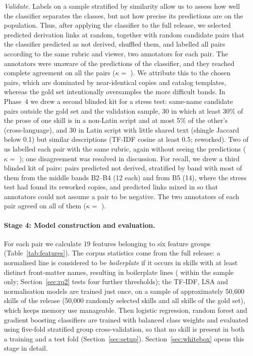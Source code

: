 \documentclass[sigconf,screen]{acmart}
\begin{document}
\emph{Validate.} Labels on a sample stratified by similarity allow us to assess how well the classifier separates the classes, but not how precise its predictions are on the population. Thus, after applying the classifier to the full release, we selected \ResValEdges{} predicted derivation links at random, together with \ResValDecoys{} random candidate pairs that the classifier predicted as not derived, shuffled them, and labelled all \ResValPairs{} pairs according to the same rubric and viewer, two annotators for each pair. The annotators were unaware of the predictions of the classifier, and they reached complete agreement on all the pairs ($\kappa = $ \ResValKappa{}). We attribute this to the chosen pairs, which are dominated by near-identical copies and catalog templates, whereas the gold set intentionally oversamples the more difficult bands. In Phase~4 we drew a second blinded kit for a stress test: \ResSTPairs{} same-name candidate pairs outside the gold set and the validation sample, 30 in which at least 30\% of the prose of one skill is in a non-Latin script and at most 5\% of the other's (cross-language), and 30 in Latin script with little shared text (shingle Jaccard below 0.1) but similar descriptions (TF-IDF cosine at least 0.5; reworked). Two of us labelled each pair with the same rubric, again without seeing the predictions ($\kappa = $ \ResSTKappa{}); one disagreement was resolved in discussion. For recall, we drew a third blinded kit of \ResRCPairs{} pairs: \ResRCNeg{} pairs predicted not derived, stratified by band with most of them from the middle bands B2--B4 (12 each) and from B5 (14), where the stress test had found its reworked copies, and \ResRCPos{} predicted links mixed in so that annotators could not assume a pair to be negative. The two annotators of each pair agreed on all of them ($\kappa = $ \ResRCKappa{}).

\paragraph{Stage 4: Model construction and evaluation.} For each pair we calculate 19 features belonging to six feature groups (Table~\ref{tab:features}). The corpus statistics come from the full release: a normalised line is considered to be \emph{boilerplate} if it occurs in skills with at least \ResBoilerK{} distinct front-matter names, resulting in \ResFullBoilerLines{} boilerplate lines (\ResBoilerLines{} within the sample only; Section~\ref{sec:rq2} tests four further thresholds); the TF-IDF, LSA and normalisation models are trained just once, on a sample of approximately 50,600 skills of the release (50,000 randomly selected skills and all skills of the gold set), which keeps memory use manageable. Then logistic regression, random forest and gradient boosting classifiers are trained with balanced class weights and evaluated using five-fold stratified group cross-validation, so that no skill is present in both a training and a test fold (Section~\ref{sec:setup}). Section~\ref{sec:whitebox} opens this stage in detail.
\end{document}
